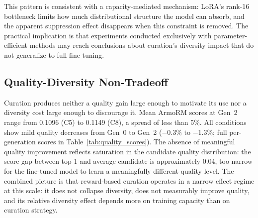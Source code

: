 This pattern is consistent with a capacity-mediated mechanism: LoRA's rank-16 bottleneck limits how much distributional structure the model can absorb, and the apparent suppression effect disappears when this constraint is removed. The practical implication is that experiments conducted exclusively with parameter-efficient methods may reach conclusions about curation's diversity impact that do not generalize to full fine-tuning.

\subsection{Quality-Diversity Non-Tradeoff}
\label{sec:quality_diversity}

Curation produces neither a quality gain large enough to motivate its use nor a diversity cost large enough to discourage it. Mean ArmoRM scores at Gen~2 range from 0.1096 (C5) to 0.1149 (C8), a spread of less than 5\%. All conditions show mild quality decreases from Gen~0 to Gen~2 ($-$0.3\% to $-$1.3\%; full per-generation scores in Table~\ref{tab:quality_scores}). The absence of meaningful quality improvement reflects saturation in the candidate quality distribution: the score gap between top-1 and average candidate is approximately 0.04, too narrow for the fine-tuned model to learn a meaningfully different quality level. The combined picture is that reward-based curation operates in a narrow effect regime at this scale: it does not collapse diversity, does not measurably improve quality, and its relative diversity effect depends more on training capacity than on curation strategy.
